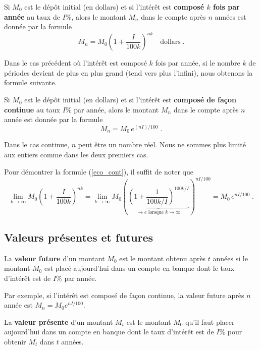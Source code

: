 {\begin{meth} 
Si $M_0$ est le dépôt initial (en dollars) et si l'intérêt est
{\bfseries composé $k$ fois par année} au taux de $I$\%, alors le
montant $M_n$ dans le compte après $n$ années est donnée par la formule
\[
M_n = M_0\left(1+\frac{I}{100k}\right)^{nk} \quad \text{dollars} \; .
\]
\end{meth}

Dans le cas précédent où l'intérêt est composé $k$ fois par année, si le
nombre $k$ de périodes devient de plus en plus grand (tend vers plus
l'infini), nous obtenons la formule suivante.

\begin{meth}  
Si $M_0$ est le dépôt initial (en dollars) et si l'intérêt est
{\bfseries composé de façon continue}
au taux $I$\% par année, alors le montant $M_n$ dans le compte après $n$
année est donnée par la formule
\begin{equation} \label{eco_cont}
M_n = M_0 \, e^{(nI)/100} \; .
\end{equation}
\end{meth}

Dans le cas continue, $n$ peut être un nombre réel.  Nous ne sommes plus
limité aux entiers comme dans les deux premiers cas.

Pour démontrer la formule (\ref{eco_cont}), il suffit de noter que
\[
\lim_{k\rightarrow \infty} M_0\left(1+\frac{I}{100k}\right)^{nk}
= \lim_{k\rightarrow \infty} M_0\left(
\underbrace{\left(1+\frac{1}{100k/I}\right)^{100k/I}}_{\rightarrow e
\text{ lorsque } k \rightarrow \infty} \right)^{nI/100}
= M_0 \, e^{nI/100} \; .
\]

\subsection{Valeurs présentes et futures}

\begin{defn} 
La {\bfseries valeur future} d'un montant $M_0$
est le montant obtenu après $t$ années si le montant $M_0$ est placé
aujourd'hui dans un compte en banque dont le taux d'intérêt est de
$I$\% par année.
\end{defn}

Par exemple, si l'intérêt est composé de façon continue, la valeur
future après $n$ année est $M_n = M_0 e^{nI/100}$.

\begin{defn} 
La {\bfseries valeur présente} d'un montant
$M_t$ est le montant $M_0$ qu'il faut placer aujourd'hui dans un
compte en banque dont le taux d'intérêt est de $I$\% pour obtenir
$M_t$ dans $t$ années.
\end{defn}

}
